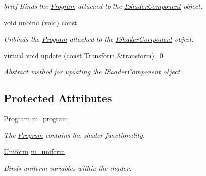 \begin{DoxyCompactItemize}
\begin{DoxyCompactList}\small\item\em brief Binds the \hyperlink{classsparky_1_1_program}{Program} attached to the \hyperlink{classsparky_1_1_i_shader_component}{I\+Shader\+Component} object. \end{DoxyCompactList}\item 
void \hyperlink{classsparky_1_1_i_shader_component_a2628a07c8ea475ae5836a135e637c38f}{unbind} (void) const \hypertarget{classsparky_1_1_i_shader_component_a2628a07c8ea475ae5836a135e637c38f}{}\label{classsparky_1_1_i_shader_component_a2628a07c8ea475ae5836a135e637c38f}

\begin{DoxyCompactList}\small\item\em Unbinds the \hyperlink{classsparky_1_1_program}{Program} attached to the \hyperlink{classsparky_1_1_i_shader_component}{I\+Shader\+Component} object. \end{DoxyCompactList}\item 
virtual void \hyperlink{classsparky_1_1_i_shader_component_a0bf4ef38fcf1ac17fd1852668baeef88}{update} (const \hyperlink{classsparky_1_1_transform}{Transform} \&transform)=0
\begin{DoxyCompactList}\small\item\em Abstract method for updating the \hyperlink{classsparky_1_1_i_shader_component}{I\+Shader\+Component} object. \end{DoxyCompactList}\end{DoxyCompactItemize}
\subsection*{Protected Attributes}
\begin{DoxyCompactItemize}
\item 
\hyperlink{classsparky_1_1_program}{Program} \hyperlink{classsparky_1_1_i_shader_component_a6c49e26d6219ad9a1d41fb234332a076}{m\+\_\+program}\hypertarget{classsparky_1_1_i_shader_component_a6c49e26d6219ad9a1d41fb234332a076}{}\label{classsparky_1_1_i_shader_component_a6c49e26d6219ad9a1d41fb234332a076}

\begin{DoxyCompactList}\small\item\em The \hyperlink{classsparky_1_1_program}{Program} contains the shader functionality. \end{DoxyCompactList}\item 
\hyperlink{classsparky_1_1_uniform}{Uniform} \hyperlink{classsparky_1_1_i_shader_component_aabcb035e34d2470b075803ac0b8300fa}{m\+\_\+uniform}\hypertarget{classsparky_1_1_i_shader_component_aabcb035e34d2470b075803ac0b8300fa}{}\label{classsparky_1_1_i_shader_component_aabcb035e34d2470b075803ac0b8300fa}

\begin{DoxyCompactList}\small\item\em Binds uniform variables within the shader. \end{DoxyCompactList}\end{DoxyCompactItemize}
